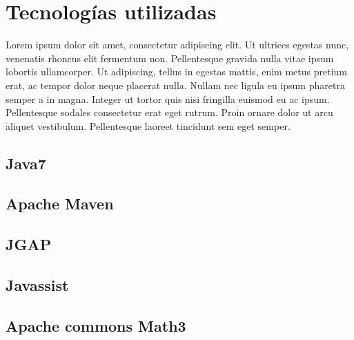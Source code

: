 
\chapter{Tecnologías utilizadas}


Lorem ipsum dolor sit amet, consectetur adipiscing elit. Ut ultrices egestas nunc, venenatis rhoncus elit fermentum non. Pellentesque gravida nulla vitae ipsum lobortis ullamcorper. Ut adipiscing, tellus in egestas mattis, enim metus pretium erat, ac tempor dolor neque placerat nulla. Nullam nec ligula eu ipsum pharetra semper a in magna. Integer ut tortor quis nisi fringilla euismod eu ac ipsum. Pellentesque sodales consectetur erat eget rutrum. Proin ornare dolor ut arcu aliquet vestibulum. Pellentesque laoreet tincidunt sem eget semper.

\section{Java7}

\section{Apache Maven}

\section{JGAP}

\section{Javassist}

\section{Apache commons Math3}
